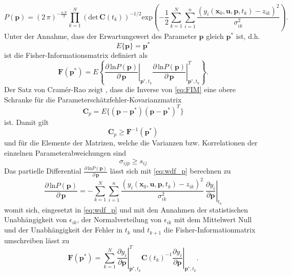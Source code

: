 \begin{equation}\label{eq:wdf_p}
P(\pmb{p}) = (2\, \pi)^{-\frac{n\,N}{2}}\prod^N_{k=1}\left(\mathrm{det}\,\pmb{C}(t_k)\right)^{-1/2}\mathrm{exp}\left(-\frac{1}{2}\sum^N_{k=1}\sum^n_{i=1}\frac{\left(y_i(\pmb{x}_0,\pmb{u},\pmb{p},t_k)-z_{ik}\right)^2}{\sigma^2_{ik}}\right).
\end{equation}
Unter der Annahme, dass der Erwartungswert des Parameter $\pmb{p}$ gleich $\pmb{p}^*$ ist, d.h. 
\begin{equation}
E\lbrace\pmb{p}\rbrace = \pmb{p}^*
\end{equation}
ist die Fisher-Informationsmatrix definiert als
\begin{equation}\label{eq:FIM}
\pmb{F}(\pmb{p}^*)=E\left\lbrace\left. \frac{\partial\,\mathrm{ln}P(\pmb{p})}{\partial\, \pmb{p}}\right|_{\pmb{p}^*,t_k} \left.\frac{\partial\,\mathrm{ln}P(\pmb{p})}{\partial\, \pmb{p}}\right|_{\pmb{p}^*,t_k}^T\right\rbrace.
\end{equation}
Der Satz von Cramér-Rao zeigt \cite{Goodwin.1977}, dass die Inverse von \eqref{eq:FIM} eine obere Schranke für die Parameterschätzfehler-Kovarianzmatrix 
\begin{equation}
\pmb{C}_p = E\lbrace(\pmb{p}-\pmb{p}^*)(\pmb{p}-\pmb{p}^*)^T\rbrace
\end{equation}
ist. Damit gilt
\begin{equation}
\pmb{C}_p \geq \pmb{F}^{-1}(\pmb{p}^*)
\end{equation}
und für die Elemente der Matrizen, welche die Varianzen bzw. Korrelationen der einzelnen Parameterabweichungen sind
\begin{equation}
\sigma_{ijp} \geq s_{ij}
\end{equation}
Das partielle Differential $\frac{\partial\,\mathrm{ln}P(\pmb{p})}{\partial\, \pmb{p}}$ lässt sich mit \eqref{eq:wdf_p} berechnen zu 
\begin{equation}
\frac{\partial\,\mathrm{ln}P(\pmb{p})}{\partial\, \pmb{p}} = -\sum^N_{k=1}\sum^n_{i=1}\frac{\left(y_i(\pmb{x}_0,\pmb{u},\pmb{p},t_k)-z_{ik}\right)^2}{\sigma^2_{ik}}\ \left. \frac{\partial y_i}{\partial \pmb{p}}\right|_{t_k}
\end{equation}
womit sich, eingesetzt in \eqref{eq:wdf_p} und mit den Annahmen der statistischen Unabhängigkeit von $\epsilon_{ik}$, der Normalverteilung von $\epsilon_{ik}$ mit dem Mittelwert Null und der Unabhängigkeit der Fehler in $t_k$ und $t_{k+1}$ die Fisher-Informationmatrix umschreiben lässt zu  
\begin{equation}
\pmb{F}(\pmb{p}^*) = \sum_{k=1}^N \left. \frac{\partial y_i}{\partial \pmb{p}}\right|_{\pmb{p}^*,t_k}^T \pmb{C}(t_k)^{-1} \left.\frac{\partial y_i}{\partial \pmb{p}}\right|_{\pmb{p}^*,t_k}.
\end{equation}
